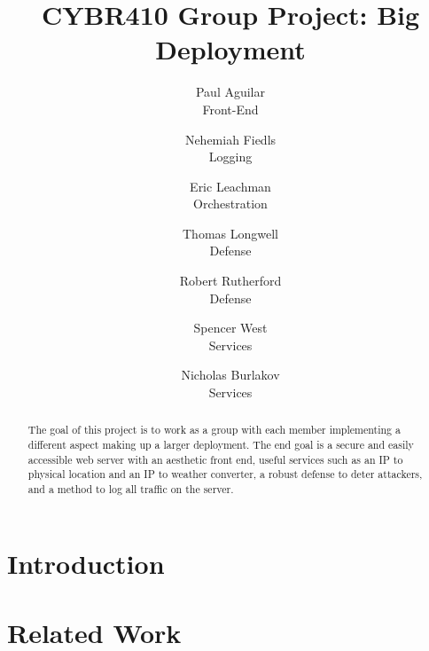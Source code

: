 \documentclass[letterpaper,twocolumn,10pt]{article}
\begin{document}

\date{}

\title{\Large \bf CYBR410 Group Project: Big Deployment}

\author{
  {\rm Paul Aguilar}\\
  Front-End
  \and
  {\rm Nehemiah Fiedls}\\
  Logging
  \and
  {\rm Eric Leachman}\\
  Orchestration
  \and
  {\rm Thomas Longwell}\\
  Defense
  \and
  {\rm Robert Rutherford}\\
  Defense
  \and
  {\rm Spencer West}\\
  Services
  \and
  {\rm Nicholas Burlakov}\\
  Services
}

\maketitle

\begin{abstract}
The goal of this project is to work as a group with each member implementing a different aspect making up a larger deployment. The end goal is a secure and easily accessible web server with an aesthetic front end, useful services such as an IP to physical location and an IP to weather converter, a robust defense to deter attackers,  and a method to log all traffic on the server. 
\end{abstract}


\section{Introduction}


\section{Related Work}

\end{document}
